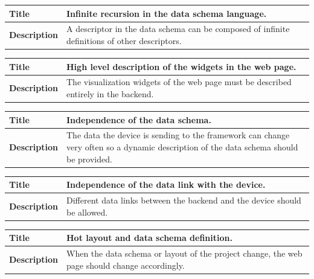 \documentclass[12pt]{article}
\begin{document}
                \begin{tabularx}{\textwidth}{|l|X|}
                    \hline
                    \textbf{Title} & Infinite recursion in the data schema
                    language. \\
                    \hline
                    \textbf{Description} & A descriptor in the data schema can
                    be composed of infinite definitions of other descriptors. \\
                    \hline
                \end{tabularx}

                \begin{tabularx}{\textwidth}{|l|X|}
                    \hline
                    \textbf{Title} & High level description of the widgets in
                    the web page. \\
                    \hline
                    \textbf{Description} & The visualization widgets of the web
                    page must be described entirely in the backend. \\
                    \hline
                \end{tabularx}

                \begin{tabularx}{\textwidth}{|l|X|}
                    \hline
                    \textbf{Title} & Independence of the data schema. \\
                    \hline
                    \textbf{Description} & The data the device is sending to the
                    framework can change very often so a dynamic description of
                    the data schema should be provided. \\
                    \hline
                \end{tabularx}

                \begin{tabularx}{\textwidth}{|l|X|}
                    \hline
                    \textbf{Title} & Independence of the data link with the
                    device. \\
                    \hline
                    \textbf{Description} & Different data links between the
                    backend and the device should be allowed. \\
                    \hline
                \end{tabularx}

                \begin{tabularx}{\textwidth}{|l|X|}
                    \hline
                    \textbf{Title} & Hot layout and data schema definition. \\
                    \hline
                    \textbf{Description} & When the data schema or layout of the
                    project change, the web page should change accordingly. \\
                    \hline
                \end{tabularx}
\end{document}
